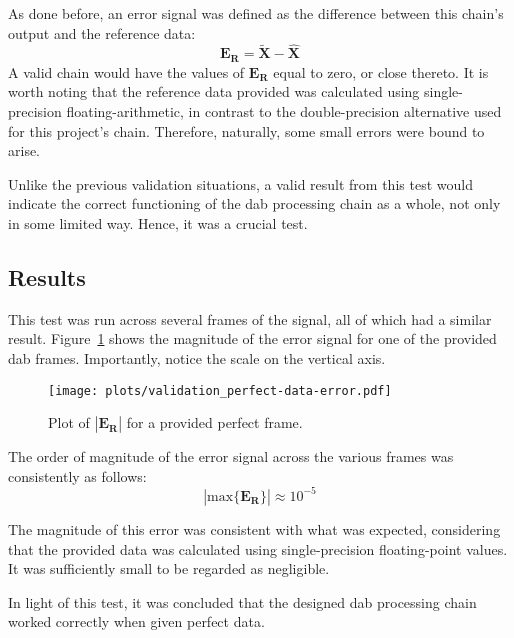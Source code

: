 \documentclass[class=report,11pt,crop=false]{standalone}
\begin{document}
As done before, an error signal was defined as the difference between this chain's output and the reference data:
\begin{equation}
  \mathbf{E_R} = \mathbf{\tilde{X}} - \mathbf{\hat{X}}
\end{equation}
A valid chain would have the values of \(\mathbf{E_R}\) equal to zero, or close thereto. It is worth noting that the reference data provided was calculated using single-precision floating-arithmetic, in contrast to the double-precision alternative used for this project's chain. Therefore, naturally, some small errors were bound to arise.

Unlike the previous validation situations, a valid result from this test would indicate the correct functioning of the \gls{dab} processing chain as a whole, not only in some limited way. Hence, it was a crucial test.

\subsection{Results}
This test was run across several frames of the signal, all of which had a similar result. Figure~\ref{fig:validation_perfect-data-error} shows the magnitude of the error signal for one of the provided \gls{dab} frames. Importantly, notice the scale on the vertical axis.

\begin{figure}
  \centering
  \captionsetup{type=figure}
  \texttt{[image: plots/validation\_perfect-data-error.pdf]}
  \caption{Plot of \(|\mathbf{E_R}|\) for a provided perfect  frame.}
  \label{fig:validation_perfect-data-error}
\end{figure}

The order of magnitude of the error signal across the various frames was consistently as follows:
\begin{equation}
  \left| \mathrm{max} \{ \mathbf{E_R} \} \right| \approx 10^{-5}
\end{equation}

The magnitude of this error was consistent with what was expected, considering that the provided data was calculated using single-precision floating-point values. It was sufficiently small to be regarded as negligible.

In light of this test, it was concluded that the designed \gls{dab} processing chain worked correctly when given perfect data.
\end{document}
